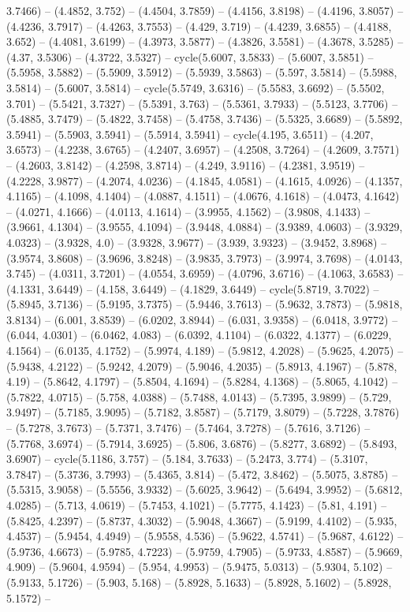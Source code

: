 3.7466) -- (4.4852, 3.752) -- (4.4504, 3.7859) -- (4.4156, 3.8198) -- (4.4196, 3.8057) -- (4.4236, 3.7917) -- (4.4263, 3.7553) -- (4.429, 3.719) -- (4.4239, 3.6855) -- (4.4188, 3.652) -- (4.4081, 3.6199) -- (4.3973, 3.5877) -- (4.3826, 3.5581) -- (4.3678, 3.5285) -- (4.37, 3.5306) -- (4.3722, 3.5327) -- cycle(5.6007, 3.5833) -- (5.6007, 3.5851) -- (5.5958, 3.5882) -- (5.5909, 3.5912) -- (5.5939, 3.5863) -- (5.597, 3.5814) -- (5.5988, 3.5814) -- (5.6007, 3.5814) -- cycle(5.5749, 3.6316) -- (5.5583, 3.6692) -- (5.5502, 3.701) -- (5.5421, 3.7327) -- (5.5391, 3.763) -- (5.5361, 3.7933) -- (5.5123, 3.7706) -- (5.4885, 3.7479) -- (5.4822, 3.7458) -- (5.4758, 3.7436) -- (5.5325, 3.6689) -- (5.5892, 3.5941) -- (5.5903, 3.5941) -- (5.5914, 3.5941) -- cycle(4.195, 3.6511) -- (4.207, 3.6573) -- (4.2238, 3.6765) -- (4.2407, 3.6957) -- (4.2508, 3.7264) -- (4.2609, 3.7571) -- (4.2603, 3.8142) -- (4.2598, 3.8714) -- (4.249, 3.9116) -- (4.2381, 3.9519) -- (4.2228, 3.9877) -- (4.2074, 4.0236) -- (4.1845, 4.0581) -- (4.1615, 4.0926) -- (4.1357, 4.1165) -- (4.1098, 4.1404) -- (4.0887, 4.1511) -- (4.0676, 4.1618) -- (4.0473, 4.1642) -- (4.0271, 4.1666) -- (4.0113, 4.1614) -- (3.9955, 4.1562) -- (3.9808, 4.1433) -- (3.9661, 4.1304) -- (3.9555, 4.1094) -- (3.9448, 4.0884) -- (3.9389, 4.0603) -- (3.9329, 4.0323) -- (3.9328, 4.0) -- (3.9328, 3.9677) -- (3.939, 3.9323) -- (3.9452, 3.8968) -- (3.9574, 3.8608) -- (3.9696, 3.8248) -- (3.9835, 3.7973) -- (3.9974, 3.7698) -- (4.0143, 3.745) -- (4.0311, 3.7201) -- (4.0554, 3.6959) -- (4.0796, 3.6716) -- (4.1063, 3.6583) -- (4.1331, 3.6449) -- (4.158, 3.6449) -- (4.1829, 3.6449) -- cycle(5.8719, 3.7022) -- (5.8945, 3.7136) -- (5.9195, 3.7375) -- (5.9446, 3.7613) -- (5.9632, 3.7873) -- (5.9818, 3.8134) -- (6.001, 3.8539) -- (6.0202, 3.8944) -- (6.031, 3.9358) -- (6.0418, 3.9772) -- (6.044, 4.0301) -- (6.0462, 4.083) -- (6.0392, 4.1104) -- (6.0322, 4.1377) -- (6.0229, 4.1564) -- (6.0135, 4.1752) -- (5.9974, 4.189) -- (5.9812, 4.2028) -- (5.9625, 4.2075) -- (5.9438, 4.2122) -- (5.9242, 4.2079) -- (5.9046, 4.2035) -- (5.8913, 4.1967) -- (5.878, 4.19) -- (5.8642, 4.1797) -- (5.8504, 4.1694) -- (5.8284, 4.1368) -- (5.8065, 4.1042) -- (5.7822, 4.0715) -- (5.758, 4.0388) -- (5.7488, 4.0143) -- (5.7395, 3.9899) -- (5.729, 3.9497) -- (5.7185, 3.9095) -- (5.7182, 3.8587) -- (5.7179, 3.8079) -- (5.7228, 3.7876) -- (5.7278, 3.7673) -- (5.7371, 3.7476) -- (5.7464, 3.7278) -- (5.7616, 3.7126) -- (5.7768, 3.6974) -- (5.7914, 3.6925) -- (5.806, 3.6876) -- (5.8277, 3.6892) -- (5.8493, 3.6907) -- cycle(5.1186, 3.757) -- (5.184, 3.7633) -- (5.2473, 3.774) -- (5.3107, 3.7847) -- (5.3736, 3.7993) -- (5.4365, 3.814) -- (5.472, 3.8462) -- (5.5075, 3.8785) -- (5.5315, 3.9058) -- (5.5556, 3.9332) -- (5.6025, 3.9642) -- (5.6494, 3.9952) -- (5.6812, 4.0285) -- (5.713, 4.0619) -- (5.7453, 4.1021) -- (5.7775, 4.1423) -- (5.81, 4.191) -- (5.8425, 4.2397) -- (5.8737, 4.3032) -- (5.9048, 4.3667) -- (5.9199, 4.4102) -- (5.935, 4.4537) -- (5.9454, 4.4949) -- (5.9558, 4.536) -- (5.9622, 4.5741) -- (5.9687, 4.6122) -- (5.9736, 4.6673) -- (5.9785, 4.7223) -- (5.9759, 4.7905) -- (5.9733, 4.8587) -- (5.9669, 4.909) -- (5.9604, 4.9594) -- (5.954, 4.9953) -- (5.9475, 5.0313) -- (5.9304, 5.102) -- (5.9133, 5.1726) -- (5.903, 5.168) -- (5.8928, 5.1633) -- (5.8928, 5.1602) -- (5.8928, 5.1572) -- 